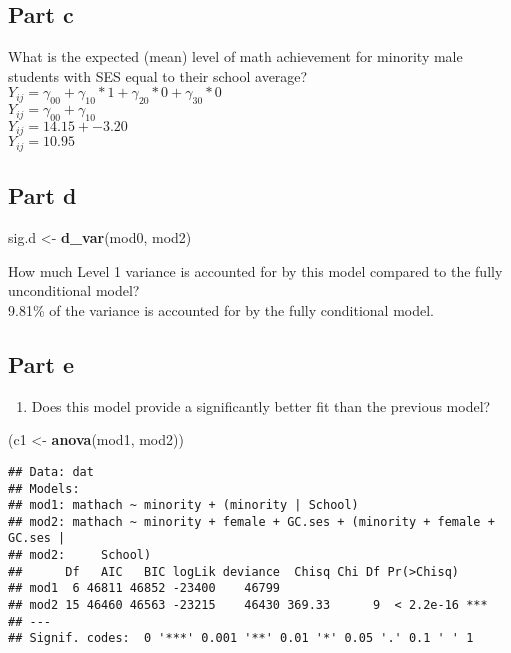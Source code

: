 \documentclass[]{article}
\newenvironment{Shaded}{\begin{snugshade}}{\end{snugshade}}
\newcommand{\KeywordTok}[1]{\textcolor[rgb]{0.13,0.29,0.53}{\textbf{#1}}}
\newcommand{\StringTok}[1]{\textcolor[rgb]{0.31,0.60,0.02}{#1}}
\newcommand{\NormalTok}[1]{#1}
\providecommand{\tightlist}{%
  \setlength{\itemsep}{0pt}\setlength{\parskip}{0pt}}
\begin{document}
\subsection{Part c}\label{part-c-1}

What is the expected (mean) level of math achievement for minority male
students with SES equal to their school average?\\
\(Y_{ij} = \gamma_{00} + \gamma_{10}*1 + \gamma_{20}*0 + \gamma_{30}*0\)\\
\(Y_{ij} = \gamma_{00} + \gamma_{10}\)\\
\(Y_{ij} = 14.15 + -3.20\)\\
\(Y_{ij} = 10.95\)

\subsection{Part d}\label{part-d-1}

\begin{Shaded}
\begin{Highlighting}[]
\NormalTok{sig.d <-}\StringTok{ }\KeywordTok{d_var}\NormalTok{(mod0, mod2)}
\end{Highlighting}
\end{Shaded}

How much Level 1 variance is accounted for by this model compared to the
fully unconditional model?\\
9.81\% of the variance is accounted for by the fully conditional model.

\subsection{Part e}\label{part-e}

\begin{enumerate}
\def\labelenumi{(\alph{enumi})}
\setcounter{enumi}{4}
\tightlist
\item
  Does this model provide a significantly better fit than the previous
  model?
\end{enumerate}

\begin{Shaded}
\begin{Highlighting}[]
\NormalTok{(c1 <-}\StringTok{ }\KeywordTok{anova}\NormalTok{(mod1, mod2)) }
\end{Highlighting}
\end{Shaded}

\begin{verbatim}
## Data: dat
## Models:
## mod1: mathach ~ minority + (minority | School)
## mod2: mathach ~ minority + female + GC.ses + (minority + female + GC.ses | 
## mod2:     School)
##      Df   AIC   BIC logLik deviance  Chisq Chi Df Pr(>Chisq)    
## mod1  6 46811 46852 -23400    46799                             
## mod2 15 46460 46563 -23215    46430 369.33      9  < 2.2e-16 ***
## ---
## Signif. codes:  0 '***' 0.001 '**' 0.01 '*' 0.05 '.' 0.1 ' ' 1
\end{verbatim}
\end{document}
